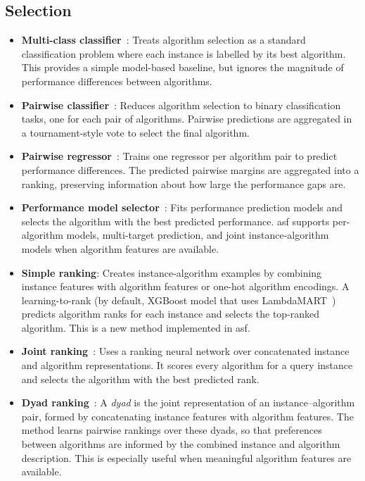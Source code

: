 \subsection{Selection}
\begin{itemize}
    \item \textbf{Multi-class classifier}~\citep{Kotthoff13}: Treats algorithm selection as a standard classification problem where each instance is labelled by its best algorithm. This provides a simple model-based baseline, but ignores the magnitude of performance differences between algorithms.
    \item \textbf{Pairwise classifier}~\citep{XuEtAl12}: Reduces algorithm selection to binary classification tasks, one for each pair of algorithms. Pairwise predictions are aggregated in a tournament-style vote to select the final algorithm.
    \item \textbf{Pairwise regressor}~\citep{KerEtAl18}: Trains one regressor per algorithm pair to predict performance differences. The predicted pairwise margins are aggregated into a ranking, preserving information about how large the performance gaps are.
    \item \textbf{Performance model selector}~\citep{NudEtAl04,XuEtAl08}: Fits performance prediction models and selects the algorithm with the best predicted performance. \gls{asf} supports per-algorithm models, multi-target prediction, and joint instance-algorithm models when algorithm features are available.
    \item \textbf{Simple ranking}: Creates instance-algorithm examples by combining instance features with algorithm features or one-hot algorithm encodings. A learning-to-rank (by default, XGBoost model that uses LambdaMART~\citep{Burges10}) predicts algorithm ranks for each instance and selects the top-ranked algorithm. This is a new method implemented in \gls{asf}.
    \item \textbf{Joint ranking}~\citep{OztEtAl22}: Uses a ranking neural network over concatenated instance and algorithm representations. It scores every algorithm for a query instance and selects the algorithm with the best predicted rank.
    \item \textbf{Dyad ranking}~\citep{TorEtAl18}: A \emph{dyad} is the joint representation of an instance--algorithm pair, formed by concatenating instance features with algorithm features. The method learns pairwise rankings over these dyads, so that preferences between algorithms are informed by the combined instance and algorithm description. This is especially useful when meaningful algorithm features are available.

\end{itemize}

